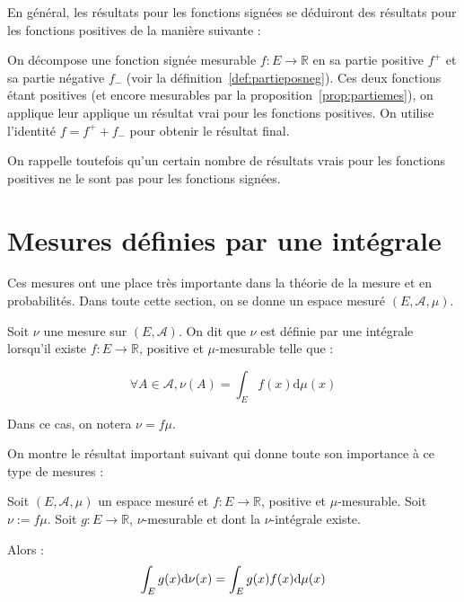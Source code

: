 \documentclass[../integ-proba.tex]{subfiles}
\begin{document}
  En général, les résultats pour les fonctions signées se déduiront des résultats pour les fonctions positives de la manière suivante :
  \begin{itemize}
    \itemb On décompose une fonction signée mesurable $f:E\longrightarrow\mathbb{R}$ en sa partie positive $f^+$ et sa partie négative $f_-$ (voir la définition~\ref{def:partieposneg}).
    \itemb Ces deux fonctions étant positives (et encore mesurables par la proposition~\ref{prop:partiemes}), on applique leur applique un résultat vrai pour les fonctions positives.
    \itemb On utilise l'identité $f=f^++f_-$ pour obtenir le résultat final.
  \end{itemize}

  On rappelle toutefois qu'un certain nombre de résultats vrais pour les fonctions positives ne le sont pas pour les fonctions signées.


  \section{Mesures définies par une intégrale}
  \label{sec:mes_defi_int}

  Ces mesures ont une place très importante dans la théorie de la mesure et en probabilités.
  Dans toute cette section, on se donne un espace mesuré $\left(E, \mathcal{A}, \mu\right)$.

  \begin{defi}
    Soit $\nu$ une mesure sur $\left(E, \mathcal{A}\right)$.
    On dit que $\nu$ est définie par une intégrale lorsqu'il existe $f:E \rightarrow \mathbb{R}$, positive et $\mu$-mesurable telle que :

    \begin{displaymath}
      \forall A \in \mathcal{A}, \nu(A)=\int_E f(x) \text{d} \mu(x)
    \end{displaymath}

    Dans ce cas, on notera $\nu = f \mu$.
  \end{defi}

  On montre le résultat important suivant qui donne toute son importance à ce type de mesures :

  \begin{thm}
        Soit $\left( E, \mathcal{A}, \mu \right)$ un espace mesuré et $f:E \rightarrow \mathbb{R}$, positive et $\mu$-mesurable.
        Soit $\nu:=f \mu$.
        Soit $g: E \rightarrow \mathbb{R}$, $\nu$-mesurable et dont la $\nu$-intégrale existe.

        Alors :
        \begin{displaymath}
          \int_E g(x) \textnormal{d} \nu(x) = \int_E g(x) f(x) \textnormal{d} \mu(x)
        \end{displaymath}
    \end{thm}
\end{document}
